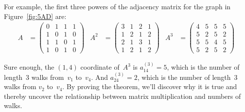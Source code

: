 For example, the first three powers of the adjacency matrix for the
graph in Figure~\ref{fig:5AD} are:
\begin{align*}
    A &= \begin{pmatrix}
            0 & 1 & 1 & 1 \\
            1 & 0 & 1 & 0 \\
            1 & 1 & 0 & 1 \\
            1 & 0 & 1 & 0
         \end{pmatrix} & %
  A^2 &= \begin{pmatrix}
            3 & 1 & 2 & 1 \\
            1 & 2 & 1 & 2 \\
            2 & 1 & 3 & 1 \\
            1 & 2 & 1 & 2
         \end{pmatrix} & %
  A^3 &= \begin{pmatrix}
            4 & 5 & 5 & 5 \\
            5 & 2 & 5 & 2 \\
            5 & 5 & 4 & 5 \\
            5 & 2 & 5 & 2
         \end{pmatrix}
\end{align*}

Sure enough, the $(1, 4)$ coordinate of~$A^3$ is $a_{14}^{(3)} = 5$,
which is the number of length~3 walks from~$v_1$ to~$v_4$.  And
$a_{24}^{(3)} = 2$, which is the number of length~3 walks from $v_2$
to~$v_4$.  By proving the theorem, we'll discover why it is true and
thereby uncover the relationship between matrix multiplication and
numbers of walks.


